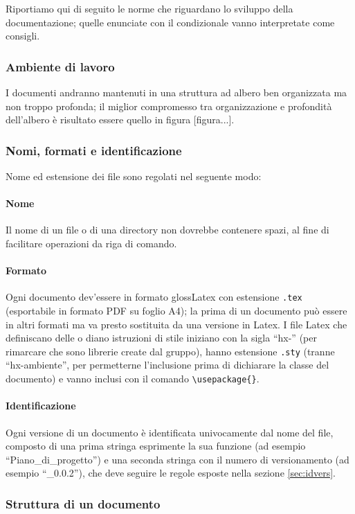 		Riportiamo qui di seguito le norme che riguardano lo sviluppo della documentazione; quelle enunciate con il condizionale vanno interpretate come consigli.
		
		\subsubsection{Ambiente di lavoro}
			I documenti andranno mantenuti in una struttura ad albero ben organizzata ma non troppo profonda; il miglior compromesso tra organizzazione e profondità dell'albero è risultato essere quello in figura [figura...].
		
		\subsubsection{Nomi, formati e identificazione}
			Nome ed estensione dei file sono regolati nel seguente modo:
			\paragraph{Nome}
				Il nome di un file o di una directory non dovrebbe contenere spazi, al fine di facilitare operazioni da riga di comando.
			\paragraph{Formato} 
				Ogni documento dev'essere in formato gloss{Latex} con estensione \texttt{.tex} (esportabile in formato PDF su foglio A4); la prima  di un documento può essere in altri formati ma va presto sostituita da una versione in Latex. I file Latex che definiscano delle  o diano istruzioni di stile iniziano con la sigla “hx-” (per rimarcare che sono librerie create dal gruppo), hanno estensione \texttt{.sty} (tranne “hx-ambiente”, per permetterne l'inclusione prima di dichiarare la classe del documento) e vanno inclusi con il comando \texttt{\textbackslash usepackage\{\}}.
			\paragraph{Identificazione} 
				Ogni versione di un documento è identificata univocamente dal nome del file, composto di una prima stringa esprimente la sua funzione (ad esempio “Piano\_di\_progetto”) e una seconda stringa con il numero di versionamento (ad esempio “\_0.0.2”), che deve seguire le regole esposte nella sezione \ref{sec:idvers}.
		
		\subsubsection{Struttura di un documento}
